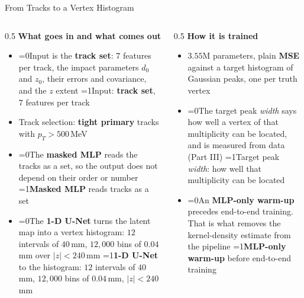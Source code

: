\documentclass[xcolor=table,aspectratio=169]{beamer}
\providecommand{\talkbuild}{0}
\newcommand{\readingonly}[1]{\ifnum\talkbuild=0\relax#1\fi}
\newcommand{\talkonly}[1]{\ifnum\talkbuild=1\relax#1\fi}
\begin{document}
\begin{frame}{From Tracks to a Vertex Histogram}
    \vspace{0.3em}
    \begin{columns}[t]
        \begin{column}{0.5\linewidth}
            \footnotesize
            \textbf{What goes in and what comes out}
            \begin{itemize}\setlength\itemsep{0.2em}
                \item \readingonly{Input is the \textbf{track set}: $7$ features per
                    track, the impact parameters $d_0$ and $z_0$,
                    their errors and covariance, and the $z$ extent}%
                    \talkonly{Input: \textbf{track set}, $7$ features per track}
                \item Track selection: \textbf{tight primary} tracks with
                    $p_T > 500$\,MeV
                \item \readingonly{The \textbf{masked MLP} reads the tracks as a
                    set, so the output does not depend on their order
                    or number}%
                    \talkonly{\textbf{Masked MLP} reads tracks as a set}
                \item \readingonly{The \textbf{1-D U-Net} turns the latent map into a vertex
                    histogram: $12$ intervals of $40$\,mm, $12{,}000$ bins of
                    $0.04$\,mm over $|z| < 240$\,mm}%
                    \talkonly{\textbf{1-D U-Net} to the histogram: $12$ intervals of
                    $40$\,mm, $12{,}000$ bins of $0.04$\,mm, $|z| < 240$\,mm}
            \end{itemize}
        \end{column}
        \begin{column}{0.5\linewidth}
            \footnotesize
            \textbf{How it is trained}
            \begin{itemize}\setlength\itemsep{0.2em}
                \item $3.55$M parameters, plain \textbf{MSE} against a target histogram
                    of Gaussian peaks, one per truth vertex
                \item \readingonly{The target peak \emph{width} says how well a vertex of that
                    multiplicity can be located, and is measured from
                    data (Part III)}%
                    \talkonly{Target peak \emph{width}: how well that multiplicity
                    can be located}
                \item \readingonly{An \textbf{MLP-only warm-up} precedes end-to-end
                    training. That is what removes the kernel-density
                    estimate from the pipeline}%
                    \talkonly{\textbf{MLP-only warm-up} before end-to-end training}
            \end{itemize}
        \end{column}
    \end{columns}
\end{frame}
\end{document}
